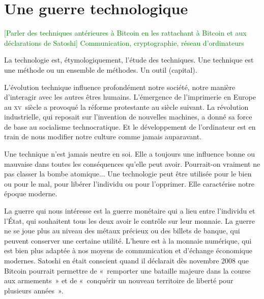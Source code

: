 
\chapter{Une guerre technologique}
\label{ch:cypherpunks}

\textcolor{green}{[Parler des techniques antérieures à Bitcoin en les rattachant à Bitcoin et aux déclarations de Satoshi] Communication, cryptographie, réseau d'ordinateurs}

La technologie est, étymologiquement, l'étude des techniques. Une technique est une méthode ou un ensemble de méthodes. Un outil (capital). %

L'évolution technique influence profondément notre société, notre manière d'interagir avec les autres êtres humains. L'émergence de l'imprimerie en Europe au \textsc{xv}\ieme{}~siècle a provoqué la réforme protestante au siècle suivant. La révolution industrielle, qui reposait sur l'invention de nouvelles machines, a donné sa force de base au socialisme technocratique. Et le développement de l'ordinateur est en train de nous modifier notre culture comme jamais auparavant.

Une technique n'est jamais neutre en soi. Elle a toujours une influence bonne ou mauvaise dans toutes les conséquences qu'elle peut avoir. Pourrait-on vraiment ne pas classer la bombe atomique... Une technologie peut être utilisée pour le bien ou pour le mal, pour libérer l'individu ou pour l'opprimer. Elle caractérise notre époque moderne.

La guerre qui nous intéresse est la guerre monétaire qui a lieu entre l'individu et l'État, qui souhaitent tous les deux avoir le contrôle sur leur monnaie. La guerre ne se joue plus au niveau des métaux précieux ou des billets de banque, qui peuvent conserver une certaine utilité. L'heure est à la monnaie numérique, qui est bien plus adaptée à nos moyens de communication et d'échange économique modernes. Satoshi en était conscient quand il déclarait dès novembre 2008 que Bitcoin pourrait permettre de «~remporter une bataille majeure dans la course aux armements~» et de «~conquérir un nouveau territoire de liberté pour plusieurs années~».


